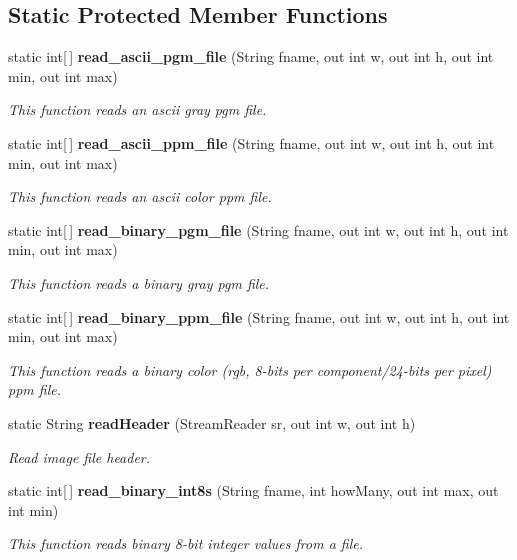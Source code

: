 \subsection*{Static Protected Member Functions}
\begin{CompactItemize}
\item 
static int[$\,$] {\bf read\_\-ascii\_\-pgm\_\-file} (String fname, out int w, out int h, out int min, out int max)
\begin{CompactList}\small\item\em This function reads an ascii gray pgm file. \item\end{CompactList}\item 
static int[$\,$] {\bf read\_\-ascii\_\-ppm\_\-file} (String fname, out int w, out int h, out int min, out int max)
\begin{CompactList}\small\item\em This function reads an ascii color ppm file. \item\end{CompactList}\item 
static int[$\,$] {\bf read\_\-binary\_\-pgm\_\-file} (String fname, out int w, out int h, out int min, out int max)
\begin{CompactList}\small\item\em This function reads a binary gray pgm file. \item\end{CompactList}\item 
static int[$\,$] {\bf read\_\-binary\_\-ppm\_\-file} (String fname, out int w, out int h, out int min, out int max)
\begin{CompactList}\small\item\em This function reads a binary color (rgb, 8-bits per component/24-bits per pixel) ppm file. \item\end{CompactList}\item 
static String {\bf read\-Header} (Stream\-Reader sr, out int w, out int h)
\begin{CompactList}\small\item\em Read image file header. \item\end{CompactList}\item 
static int[$\,$] {\bf read\_\-binary\_\-int8s} (String fname, int how\-Many, out int max, out int min)
\begin{CompactList}\small\item\em This function reads binary 8-bit integer values from a file. \item\end{CompactList}\item 

\end{CompactItemize}
